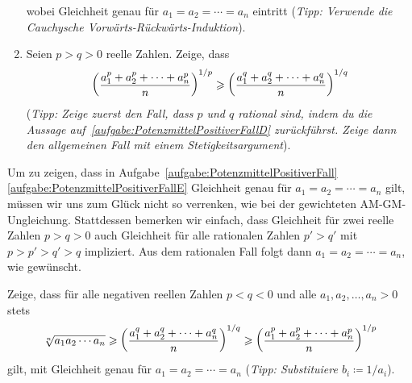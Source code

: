 \begin{aufgabe*}
\begin{enumerate}[label={$(\alph*)$},ref={$(\alph*)$}]
\begin{equation*}
		\end{equation*}
		wobei Gleichheit genau für $a_1=a_2=\dotsb=a_n$ eintritt (\emph{Tipp: Verwende die Cauchysche Vorwärts-Rückwärts-Induktion}).\label{aufgabe:PotenzmittelPositiverFallC}
		\item Seien $p>q>0$ reelle Zahlen. Zeige, dass\label{aufgabe:PotenzmittelPositiverFallD}
		\begin{equation*}
			\parens*{\frac{a_1^{p}+a_2^{p}+\dotsb+a_n^{p}}{n}}^{1/p}\geqslant \parens*{\frac{a_1^{q}+a_2^{q}+\dotsb+a_n^q}{n}}^{1/q}
		\end{equation*}
		(\emph{Tipp: Zeige zuerst den Fall, dass $p$ und $q$ rational sind, indem du die Aussage auf~\ref{aufgabe:PotenzmittelPositiverFallD} zurückführst. Zeige dann den allgemeinen Fall mit einem Stetigkeitsargument}).\label{aufgabe:PotenzmittelPositiverFallE}
	\end{enumerate}
\end{aufgabe*}
Um zu zeigen, dass in Aufgabe~\ref{aufgabe:PotenzmittelPositiverFall}\ref{aufgabe:PotenzmittelPositiverFallE} Gleichheit genau für $a_1=a_2=\dotsb=a_n$ gilt, müssen wir uns zum Glück nicht so verrenken, wie bei der gewichteten AM-GM-Ungleichung. Stattdessen bemerken wir einfach, dass Gleichheit für zwei reelle Zahlen $p>q>0$ auch Gleichheit für alle rationalen Zahlen $p'>q'$ mit $p>p'>q'>q$ impliziert. Aus dem rationalen Fall folgt dann $a_1=a_2=\dotsb=a_n$, wie gewünscht.
\begin{aufgabe*}
	Zeige, dass für alle negativen reellen Zahlen $p<q<0$ und alle $a_1,a_2,\dotsc,a_n>0$ stets
	\begin{equation*}
		\sqrt[n]{a_1a_2\dotsm a_n}\geqslant \parens*{\frac{a_1^q+a_2^q+\dotsb+a_n^q}{n}}^{1/q}\geqslant  \parens*{\frac{a_1^p+a_2^p+\dotsb+a_n^p}{n}}^{1/p}
	\end{equation*}
	gilt, mit Gleichheit genau für $a_1=a_2=\dotsb=a_n$ (\emph{Tipp: Substituiere $b_i\coloneqq 1/a_i$}).
\end{aufgabe*}